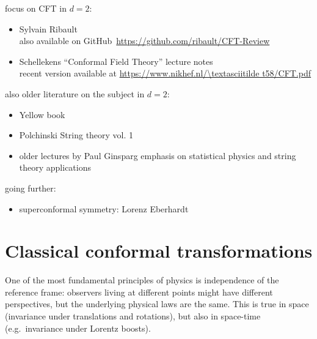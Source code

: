 \documentclass[a4paper,12pt]{article}
\numberwithin{equation}{section}
\begin{document}

focus on CFT in $d = 2$:
\begin{itemize}

\item
Sylvain Ribault \cite{Ribault:2014hia} \\
also available on GitHub~\url{https://github.com/ribault/CFT-Review}

\item
Schellekens ``Conformal Field Theory'' lecture notes~\cite{Schellekens:1996tg} \\
recent version available at
\url{https://www.nikhef.nl/\textasciitilde t58/CFT.pdf}

\end{itemize}

also older literature on the subject  in $d = 2$:
\begin{itemize}

\item
Yellow book
\cite{DiFrancesco:1997nk}

\item
Polchinski String theory vol. 1
\cite{Polchinski:1998rq}

\item
older lectures by Paul Ginsparg
\cite{Ginsparg:1988ui}
emphasis on statistical physics and string theory applications

\end{itemize}


going further:
\begin{itemize}

\item
superconformal symmetry: Lorenz Eberhardt 
\cite{Eberhardt:2020cxo}

\end{itemize}



\section{Classical conformal transformations}

One of the most fundamental principles of physics is independence of the reference frame: observers living at different points might have different perspectives, but the underlying physical laws are the same.
This is true in space (invariance under translations and rotations), but also in space-time (e.g.~invariance under Lorentz boosts).
\end{document}
